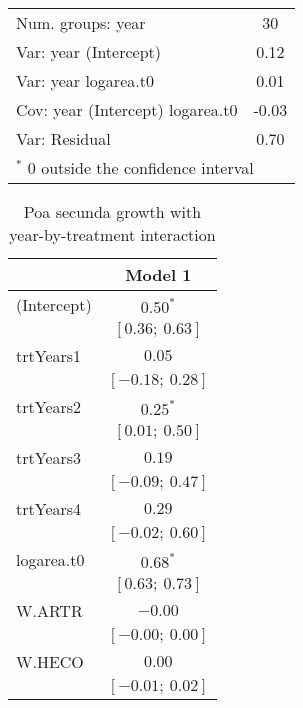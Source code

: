 \documentclass[11pt]{article}
\begin{document}
\begin{table}
\begin{center}
\begin{tabular}{l c }
Num. groups: year                & 30                \\
Var: year (Intercept)            & 0.12              \\
Var: year logarea.t0             & 0.01              \\
Cov: year (Intercept) logarea.t0 & -0.03             \\
Var: Residual                    & 0.70              \\
\hline
\multicolumn{2}{l}{\scriptsize{$^*$ 0 outside the confidence interval}}
\end{tabular}
\label{table:PSSPgrowth-inARTR}
\end{center}
\end{table}


\begin{table}
\caption{Poa secunda growth with year-by-treatment interaction}
\begin{center}
\begin{tabular}{l c }
\hline
 & Model 1 \\
\hline
(Intercept)                      & $0.50^{*}$        \\
                                 & $[0.36;\ 0.63]$   \\
trtYears1                        & $0.05$            \\
                                 & $[-0.18;\ 0.28]$  \\
trtYears2                        & $0.25^{*}$        \\
                                 & $[0.01;\ 0.50]$   \\
trtYears3                        & $0.19$            \\
                                 & $[-0.09;\ 0.47]$  \\
trtYears4                        & $0.29$            \\
                                 & $[-0.02;\ 0.60]$  \\
logarea.t0                       & $0.68^{*}$        \\
                                 & $[0.63;\ 0.73]$   \\
W.ARTR                           & $-0.00$           \\
                                 & $[-0.00;\ 0.00]$  \\
W.HECO                           & $0.00$            \\
                                 & $[-0.01;\ 0.02]$  \\

\end{tabular}
\end{center}
\end{table}
\end{document}
